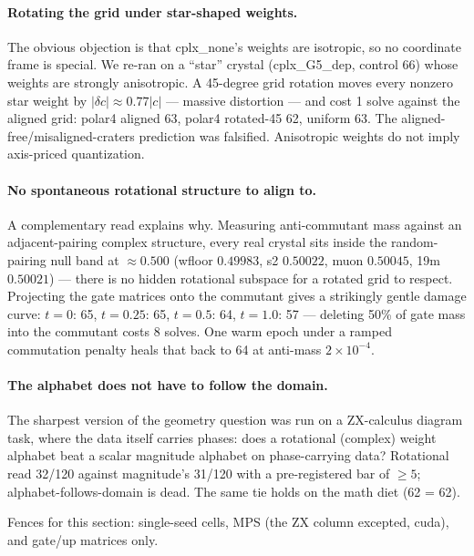 \documentclass[11pt]{article}
\begin{document}
\paragraph{Rotating the grid under star-shaped weights.}
The obvious objection is that cplx\_none's weights are isotropic, so no
coordinate frame is special. We re-ran on a ``star'' crystal (cplx\_G5\_dep,
control 66) whose weights are strongly anisotropic. A 45-degree grid rotation
moves every nonzero star weight by $|\delta c| \approx 0.77|c|$ --- massive
distortion --- and cost 1 solve against the aligned grid: polar4 aligned 63,
polar4 rotated-45 62, uniform 63. %
The aligned-free/misaligned-craters prediction was falsified. Anisotropic weights
do not imply axis-priced quantization.

\paragraph{No spontaneous rotational structure to align to.}
A complementary read explains why. Measuring anti-commutant mass against an
adjacent-pairing complex structure, every real crystal sits inside the
random-pairing null band at $\approx 0.500$ (wfloor $0.49983$, s2 $0.50022$,
muon $0.50045$, 19m $0.50021$) --- there is no hidden rotational subspace for a
rotated grid to respect. %
Projecting the gate matrices onto the commutant gives a strikingly gentle damage
curve: $t{=}0$: 65, $t{=}0.25$: 65, $t{=}0.5$: 64, $t{=}1.0$: 57 --- deleting
50\% of gate mass into the commutant costs 8 solves. %
One warm epoch under a ramped commutation penalty heals that back to 64 at
anti-mass $2\times 10^{-4}$. %

\paragraph{The alphabet does not have to follow the domain.}
The sharpest version of the geometry question was run on a ZX-calculus diagram
task, where the data itself carries phases: does a rotational (complex) weight
alphabet beat a scalar magnitude alphabet on phase-carrying data? Rotational
read 32/120 against magnitude's 31/120 with a pre-registered bar of $\geq 5$;
alphabet-follows-domain is dead. The same tie holds on the math diet (62 = 62).

Fences for this section: single-seed cells, MPS (the ZX column excepted, cuda),
and gate/up matrices only.
\end{document}
